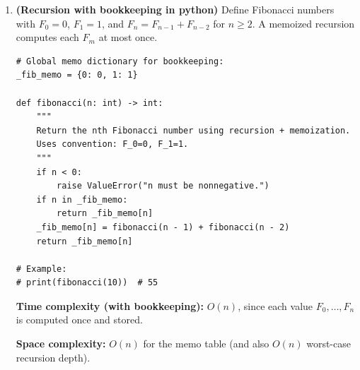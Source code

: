 \documentclass[en,hazy,blue,12pt,normal]{elegantnote}
\begin{document}
\begin{enumerate}[label=\textbf{(\alph*)}, leftmargin=2.2em]
\medskip
\noindent \textbf{Space complexity:} Let $U$ be the number of unique words. The dictionary stores $U$ keys, so space is $O(U)$ (ignoring the input file storage, and treating tokenization overhead per line as transient).

\item \textbf{(Recursion with bookkeeping in python)}
Define Fibonacci numbers with $F_0=0$, $F_1=1$, and $F_n=F_{n-1}+F_{n-2}$ for $n\ge 2$.
A memoized recursion computes each $F_m$ at most once.

\begin{lstlisting}[style=py]
# Global memo dictionary for bookkeeping:
_fib_memo = {0: 0, 1: 1}

def fibonacci(n: int) -> int:
    """
    Return the nth Fibonacci number using recursion + memoization.
    Uses convention: F_0=0, F_1=1.
    """
    if n < 0:
        raise ValueError("n must be nonnegative.")
    if n in _fib_memo:
        return _fib_memo[n]
    _fib_memo[n] = fibonacci(n - 1) + fibonacci(n - 2)
    return _fib_memo[n]

# Example:
# print(fibonacci(10))  # 55
\end{lstlisting}

\noindent \textbf{Time complexity (with bookkeeping):} $O(n)$, since each value $F_0,\dots,F_n$ is computed once and stored.

\medskip
\noindent \textbf{Space complexity:} $O(n)$ for the memo table (and also $O(n)$ worst-case recursion depth).

\end{enumerate}
\end{document}
